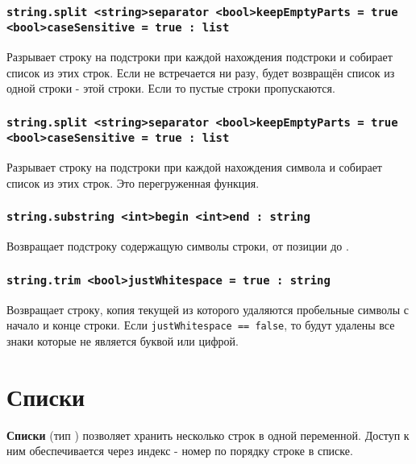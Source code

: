 \documentclass[a4paper, 14pt]{extarticle}
\begin{document}
\subsubsection{\lstinline|string.split <string>separator <bool>keepEmptyParts = true <bool>caseSensitive = true : list|}

Разрывает строку на подстроки при каждой нахождения подстроки  и собирает список из этих строк. Если  не встречается ни разу, будет возвращён список из одной строки - этой строки. Если  то пустые строки пропускаются.

\subsubsection{\lstinline|string.split <string>separator <bool>keepEmptyParts = true <bool>caseSensitive = true : list|}

Разрывает строку на подстроки при каждой нахождения символа  и собирает список из этих строк. Это перегруженная функция.

\subsubsection{\lstinline|string.substring <int>begin <int>end : string|}

Возвращает подстроку содержащую символы строки, от позиции  до .

\subsubsection{\lstinline|string.trim <bool>justWhitespace = true : string|}

Возвращает строку, копия текущей из которого удаляются пробельные символы с начало и конце строки. Если \lstinline|justWhitespace == false|, то будут удалены все знаки которые не является буквой или цифрой.


\section{Списки}

{\bf Списки} (тип ) позволяет хранить несколько строк в одной переменной. Доступ к ним обеспечивается через индекс - номер по порядку строке в списке.
\end{document}
